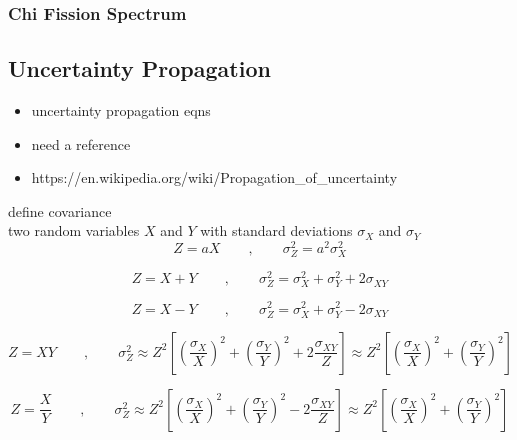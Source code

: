 \subsubsection{Chi Fission Spectrum}
\label{subsubsec:chap3-chi}


\subsection{Uncertainty Propagation}
\label{subsec:chap3-uncertainty-prop}

\begin{itemize}[noitemsep]
  \item uncertainty propagation eqns
  \item need a reference
  \item https://en.wikipedia.org/wiki/Propagation_of_uncertainty
\end{itemize}

define covariance\\
two random variables $X$ and $Y$ with standard deviations $\sigma_{X}$ and $\sigma_{Y}$\\

\begin{equation}
Z = aX \qquad,\qquad \sigma_{Z}^{2} = a^{2}\sigma_{X}^{2}
\end{equation}

\begin{equation}
Z = X + Y \qquad,\qquad \sigma_{Z}^{2} = \sigma_{X}^{2} + \sigma_{Y}^{2} + 2\sigma_{XY}
\end{equation}

\begin{equation}
Z = X - Y \qquad,\qquad \sigma_{Z}^{2} = \sigma_{X}^{2} + \sigma_{Y}^{2} - 2\sigma_{XY}
\end{equation}

\begin{equation}
Z = XY \qquad,\qquad \sigma_{Z}^{2} \approx Z^{2}\left[\left(\frac{\sigma_{X}}{X}\right)^{2} + \left(\frac{\sigma_{Y}}{Y}\right)^{2} + 2\frac{\sigma_{XY}}{Z}\right] \approx Z^{2}\left[\left(\frac{\sigma_{X}}{X}\right)^{2} + \left(\frac{\sigma_{Y}}{Y}\right)^{2}\right]
\end{equation}

\begin{equation}
Z = \frac{X}{Y} \qquad,\qquad \sigma_{Z}^{2} \approx Z^{2}\left[\left(\frac{\sigma_{X}}{X}\right)^{2} + \left(\frac{\sigma_{Y}}{Y}\right)^{2} - 2\frac{\sigma_{XY}}{Z}\right] \approx Z^{2}\left[\left(\frac{\sigma_{X}}{X}\right)^{2} + \left(\frac{\sigma_{Y}}{Y}\right)^{2}\right]
\end{equation}


